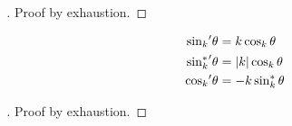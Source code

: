 \documentclass[stu, babel, american, biblatex, a4paper, leqno, draftall]{apa7}
\begin{document}
\begin{proof}[]
    Proof by exhaustion.
\end{proof}
\begin{proposition}\label{M:Trigonometry:Derivative}
    \begin{align*}
        {\sin_k}^\prime{\theta}      & = k\cos_k{\theta}       \\
        {\sin_k^\ast}^\prime{\theta} & = \lvert k\rvert\cos_k{\theta} \\
        {\cos_k}^\prime{\theta}      & = -k\sin_k^\ast{\theta}
    \end{align*}
\end{proposition}
\begin{proof}[]
    Proof by exhaustion.
\end{proof}
\end{document}
